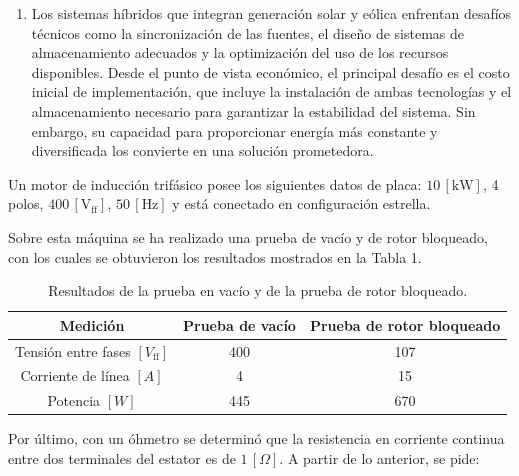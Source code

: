 \documentclass[
  11pt,
  letterpaper,
   addpoints,
   answers
  ]{exam}
\begin{document}
\begin{questions}
\begin{solution}
\begin{enumerate}
            \item Los sistemas híbridos que integran generación solar y eólica enfrentan desafíos técnicos como la sincronización de las fuentes, el diseño de sistemas de almacenamiento adecuados y la optimización del uso de los recursos disponibles. Desde el punto de vista económico, el principal desafío es el costo inicial de implementación, que incluye la instalación de ambas tecnologías y el almacenamiento necesario para garantizar la estabilidad del sistema. Sin embargo, su capacidad para proporcionar energía más constante y diversificada los convierte en una solución prometedora.
        \end{enumerate}
    \end{solution}
    \question Un motor de inducción trifásico posee los siguientes datos de placa: \(10 \, [\text{kW}]\), 4 polos, \(400 \, [\text{V}_{\text{ff}}]\), \(50 \, [\text{Hz}]\) y está conectado en configuración estrella.

    Sobre esta máquina se ha realizado una prueba de vacío y de rotor bloqueado, con los cuales se obtuvieron los resultados mostrados en la Tabla 1.
    
    \begin{table}[h!]
        \centering
        \caption{Resultados de la prueba en vacío y de la prueba de rotor bloqueado.}
        \begin{tabular}{|c|c|c|}
            \hline
            \textbf{Medición} & \textbf{Prueba de vacío} & \textbf{Prueba de rotor bloqueado} \\ \hline
            Tensión entre fases \([V_{\text{ff}}]\) & 400 & 107 \\ \hline
            Corriente de línea \([A]\) & 4 & 15 \\ \hline
            Potencia \([W]\) & 445 & 670 \\ \hline
        \end{tabular}
    \end{table}
    
    Por último, con un óhmetro se determinó que la resistencia en corriente continua entre dos terminales del estator es de \(1 \, [\Omega]\). A partir de lo anterior, se pide:
    

\end{questions}
\end{document}
